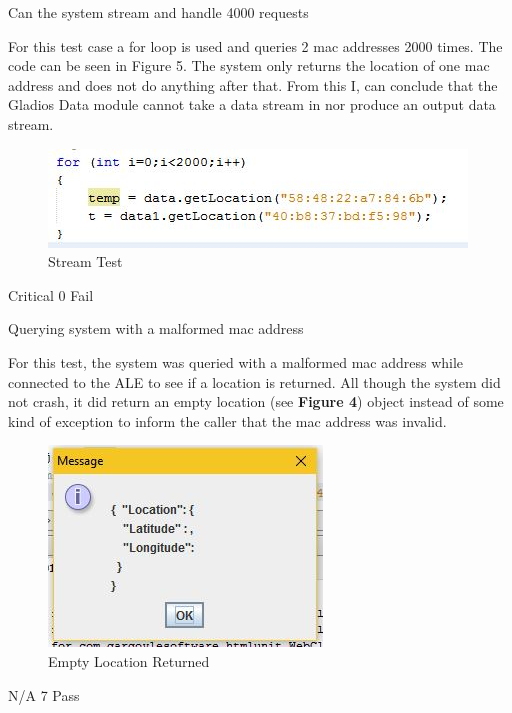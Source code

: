 \FuncReq
{Can the system stream and handle 4000 requests} 
{For this test case a for loop is used and queries 2 mac addresses 2000 times. The code can be seen in Figure 5. The system only returns the location of one mac address and does not do anything after that. From this I, can conclude that the Gladios Data module cannot take a data stream in nor produce an output data stream.
	\begin{figure}[h]
		\centering
		\includegraphics{functional/images/stream_test.jpg}
		\caption{Stream Test}
		\label{fig:Output}
	\end{figure} 
}
{Critical}
{0}
{Fail}	

\FuncReq
{Querying system with a malformed mac address}
{For this test, the system was queried with a malformed mac address while connected to the ALE to see if a location is returned. All though the system did not crash, it did return an empty location (see \textbf{Figure 4}) object instead of some kind of exception to inform the caller that the mac address was invalid.
			\begin{figure}[h]
				\centering
				\includegraphics{functional/images/wrong_mac.jpg}
				\caption{Empty Location Returned}
				\label{fig:LocationReturned}
			\end{figure}
}
{N/A}
{7}
{Pass}

